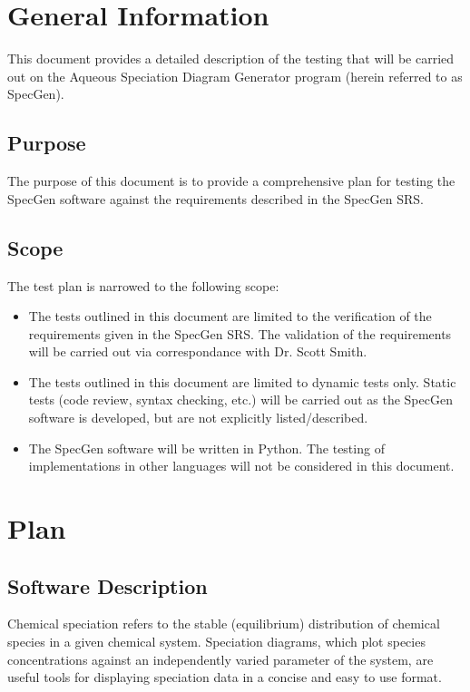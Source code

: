 \documentclass[12pt, titlepage]{article}
\newcommand{\progname}{SpecGen}
\begin{document}
\section{General Information}

This document provides a detailed description of the testing that will be 
carried out on the Aqueous Speciation Diagram Generator program (herein referred 
to as \progname{}).  

\subsection{Purpose}
The purpose of this document is to provide a comprehensive plan for testing the 
\progname{} software against the requirements described in the \progname{} SRS.

\subsection{Scope}
The test plan is narrowed to the following scope:
\begin{itemize}
\item The tests outlined in this document are limited to the verification of the 
  requirements given in the \progname{} SRS.  The validation of the requirements 
  will be carried out via correspondance with Dr. Scott Smith.
\item The tests outlined in this document are limited to dynamic tests only.  
  Static tests (code review, syntax checking, etc.) will be carried out as the 
  \progname{} software is developed, but are not explicitly listed/described.
\item The \progname{} software will be written in Python.  The testing of 
  implementations in other languages will not be considered in this document.
\end{itemize}

\section{Plan}
\label{SecPlan}
	
\subsection{Software Description}
Chemical speciation refers to the stable (equilibrium) distribution of chemical 
species in a given chemical system.   Speciation diagrams, which plot species 
concentrations against an independently varied parameter of the system, are 
useful tools for displaying speciation data in a concise and easy to use format.  
\end{document}
